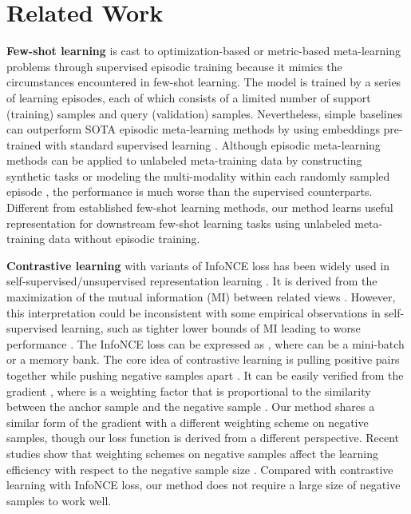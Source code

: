 \documentclass{article}
\begin{document}
\section{Related Work}
\textbf{Few-shot learning} is cast to optimization-based \citep{ravi:larochelle:2017,finn:etal:2017,nichol:etal:2018first,antoniou:Edwards:2018,lee:choi:2018gradient,park:Oliva:2019meta,flennerhag:etal:2020Warped,rusu:etal:2019meta,bertinetto:etal:2019meta} or metric-based \citep{koch:etal:2015siamese,vinyals:etal:2016,snell:etal:2017,qi:etal:2018,sung:etal:2018,oreshkin:etal:2018tadam,yoon:etal:2019tapnet,yoon:etal:2020xtarnet} meta-learning problems through supervised episodic training because it mimics the circumstances encountered in few-shot learning. The model is trained by a series of learning episodes, each of which consists of a limited number of support (training) samples and query (validation) samples. Nevertheless, simple baselines can outperform SOTA episodic meta-learning methods by using embeddings pre-trained with standard supervised learning \citep{chen:etal:2019,tian:etal:2020rethinking,dhillon:etal:2020baseline,mangla:etal:2020charting,laenen:Bertinetto:2021}. Although episodic meta-learning methods can be applied to unlabeled meta-training data by constructing synthetic tasks \citep{hsu:etal:2019unsupervised,khodadadeh:etal:2019unsupervised,khodadadeh:etal:2021unsupervised} or modeling the multi-modality within each randomly sampled episode \citep{lee:etal:2021metagmvae}, the performance is much worse than the supervised counterparts. Different from established few-shot learning methods, our method learns useful representation for downstream few-shot learning tasks using unlabeled meta-training data without episodic training. 

\textbf{Contrastive learning} with variants of InfoNCE loss \citep{gutmann:etal:2010nce,oord:etal:2018cpc} has been widely used in self-supervised/unsupervised representation learning \citep{wu:etal:2018unsupervised,henaff:etal:2020cpcv2,chen:etal:2020simclr,he:etal:2020moco}. It is derived from the maximization of the mutual information (MI) between related views \citep{poole:etal:2019variational}. However, this interpretation could be inconsistent with some empirical observations in self-supervised learning, such as tighter lower bounds of MI leading to worse performance \citep{mcallester:Stratos:2020,tschannen:etal:2020mutual,wang:isola2020}.  The InfoNCE loss can be expressed as , where  can be a mini-batch or a memory bank. The core idea of contrastive learning is pulling positive pairs together while pushing negative samples apart \citep{wang:isola2020}. It can be easily verified from the gradient , where  is a weighting factor that is proportional to the similarity between the anchor sample  and the negative sample . Our method shares a similar form of the gradient with a different weighting scheme on negative samples, though our loss function is derived from a different perspective. Recent studies show that weighting schemes on negative samples affect the learning efficiency with respect to the negative sample size \citep{wang:liu:2021understanding,yeh:etal:2021decoupled}. Compared with contrastive learning with InfoNCE loss, our method does not require a large size of negative samples to work well.
\end{document}
